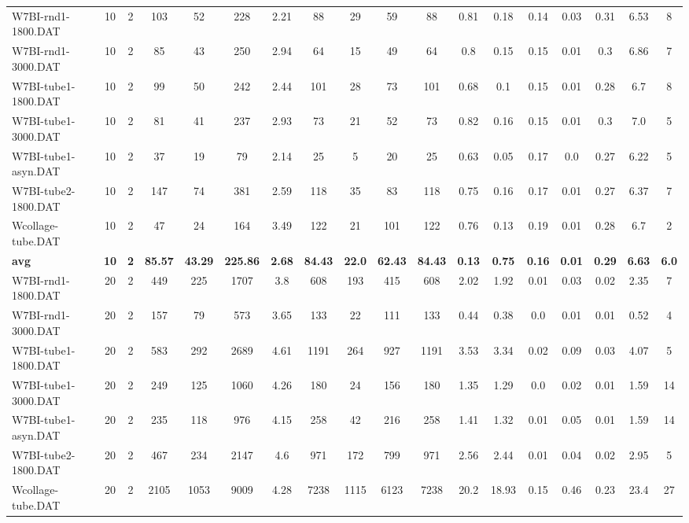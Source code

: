 \begin{sidewaystable}[h]
{\begin{tabular}{lccccccccccccccccc}
W7BI-rnd1-1800.DAT & 10 & 2 & 103 & 52 & 228 & 2.21 & 88 & 29 & 59 & 88 & 0.81 & 0.18 & 0.14 & 0.03 & 0.31 & 6.53 & 8\\
W7BI-rnd1-3000.DAT & 10 & 2 & 85 & 43 & 250 & 2.94 & 64 & 15 & 49 & 64 & 0.8 & 0.15 & 0.15 & 0.01 & 0.3 & 6.86 & 7\\
W7BI-tube1-1800.DAT & 10 & 2 & 99 & 50 & 242 & 2.44 & 101 & 28 & 73 & 101 & 0.68 & 0.1 & 0.15 & 0.01 & 0.28 & 6.7 & 8\\
W7BI-tube1-3000.DAT & 10 & 2 & 81 & 41 & 237 & 2.93 & 73 & 21 & 52 & 73 & 0.82 & 0.16 & 0.15 & 0.01 & 0.3 & 7.0 & 5\\
W7BI-tube1-asyn.DAT & 10 & 2 & 37 & 19 & 79 & 2.14 & 25 & 5 & 20 & 25 & 0.63 & 0.05 & 0.17 & 0.0 & 0.27 & 6.22 & 5\\
W7BI-tube2-1800.DAT & 10 & 2 & 147 & 74 & 381 & 2.59 & 118 & 35 & 83 & 118 & 0.75 & 0.16 & 0.17 & 0.01 & 0.27 & 6.37 & 7\\
Wcollage-tube.DAT & 10 & 2 & 47 & 24 & 164 & 3.49 & 122 & 21 & 101 & 122 & 0.76 & 0.13 & 0.19 & 0.01 & 0.28 & 6.7 & 2\\
\cline{1-18} \textbf{avg} & \textbf{10} & \textbf{2} & \textbf{85.57} & \textbf{43.29} & \textbf{225.86} & \textbf{2.68} & \textbf{84.43} & \textbf{22.0} & \textbf{62.43} & \textbf{84.43} & \textbf{0.13} & \textbf{0.75} & \textbf{0.16} & \textbf{0.01} & \textbf{0.29} & \textbf{6.63} & \textbf{6.0} \\ \cline{1-18}
W7BI-rnd1-1800.DAT & 20 & 2 & 449 & 225 & 1707 & 3.8 & 608 & 193 & 415 & 608 & 2.02 & 1.92 & 0.01 & 0.03 & 0.02 & 2.35 & 7\\
W7BI-rnd1-3000.DAT & 20 & 2 & 157 & 79 & 573 & 3.65 & 133 & 22 & 111 & 133 & 0.44 & 0.38 & 0.0 & 0.01 & 0.01 & 0.52 & 4\\
W7BI-tube1-1800.DAT & 20 & 2 & 583 & 292 & 2689 & 4.61 & 1191 & 264 & 927 & 1191 & 3.53 & 3.34 & 0.02 & 0.09 & 0.03 & 4.07 & 5\\
W7BI-tube1-3000.DAT & 20 & 2 & 249 & 125 & 1060 & 4.26 & 180 & 24 & 156 & 180 & 1.35 & 1.29 & 0.0 & 0.02 & 0.01 & 1.59 & 14\\
W7BI-tube1-asyn.DAT & 20 & 2 & 235 & 118 & 976 & 4.15 & 258 & 42 & 216 & 258 & 1.41 & 1.32 & 0.01 & 0.05 & 0.01 & 1.59 & 14\\
W7BI-tube2-1800.DAT & 20 & 2 & 467 & 234 & 2147 & 4.6 & 971 & 172 & 799 & 971 & 2.56 & 2.44 & 0.01 & 0.04 & 0.02 & 2.95 & 5\\
Wcollage-tube.DAT & 20 & 2 & 2105 & 1053 & 9009 & 4.28 & 7238 & 1115 & 6123 & 7238 & 20.2 & 18.93 & 0.15 & 0.46 & 0.23 & 23.4 & 27\\

\end{tabular}}
\end{sidewaystable}
